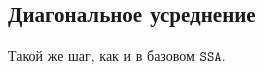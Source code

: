 \documentclass[12pt, specialist, subf
]{disser}
\theoremstyle{definition}
\newcommand{\SSA}{\texttt{SSA}}
\newtheorem{comment}{Замечание} %
\begin{document}

\subsection*{Диагональное усреднение}
Такой же шаг, как и в базовом $\SSA$.

\end{document}
